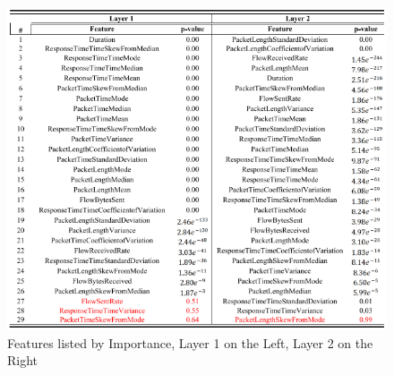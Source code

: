 \begin{figure} [h]
\includegraphics[scale=0.9]{images/behnke_features.PNG}
\centering
\caption{Features listed by Importance, Layer 1 on the Left, Layer 2 on the Right \cite{BehnkeEtAl_FeatureEngineeringMLModelMaliciusDoHTraffic}}
\label{fig:feature_importance}
\end{figure}

